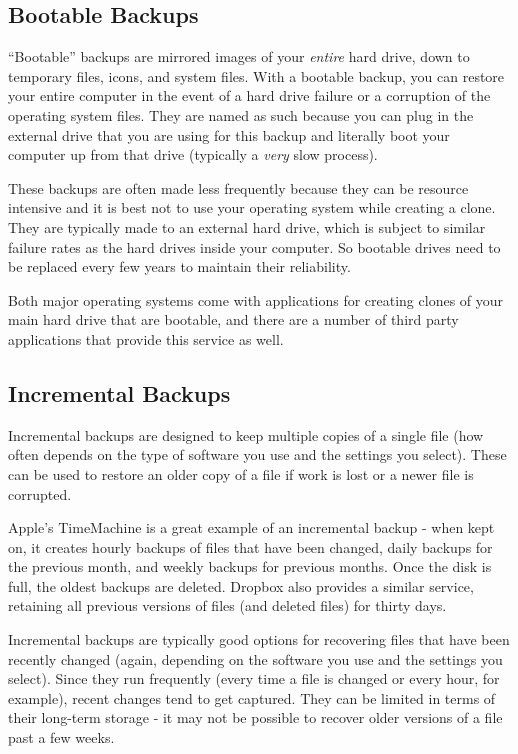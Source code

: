 \documentclass[]{book}
\begin{document}
\subsection{Bootable Backups}\label{bootable-backups}

``Bootable'' backups are mirrored images of your \emph{entire} hard
drive, down to temporary files, icons, and system files. With a bootable
backup, you can restore your entire computer in the event of a hard
drive failure or a corruption of the operating system files. They are
named as such because you can plug in the external drive that you are
using for this backup and literally boot your computer up from that
drive (typically a \emph{very} slow process).

These backups are often made less frequently because they can be
resource intensive and it is best not to use your operating system while
creating a clone. They are typically made to an external hard drive,
which is subject to similar failure rates as the hard drives inside your
computer. So bootable drives need to be replaced every few years to
maintain their reliability.

Both major operating systems come with applications for creating clones
of your main hard drive that are bootable, and there are a number of
third party applications that provide this service as well.

\subsection{Incremental Backups}\label{incremental-backups}

Incremental backups are designed to keep multiple copies of a single
file (how often depends on the type of software you use and the settings
you select). These can be used to restore an older copy of a file if
work is lost or a newer file is corrupted.

Apple's TimeMachine is a great example of an incremental backup - when
kept on, it creates hourly backups of files that have been changed,
daily backups for the previous month, and weekly backups for previous
months. Once the disk is full, the oldest backups are deleted. Dropbox
also provides a similar service, retaining all previous versions of
files (and deleted files) for thirty days.

Incremental backups are typically good options for recovering files that
have been recently changed (again, depending on the software you use and
the settings you select). Since they run frequently (every time a file
is changed or every hour, for example), recent changes tend to get
captured. They can be limited in terms of their long-term storage - it
may not be possible to recover older versions of a file past a few
weeks.
\end{document}
